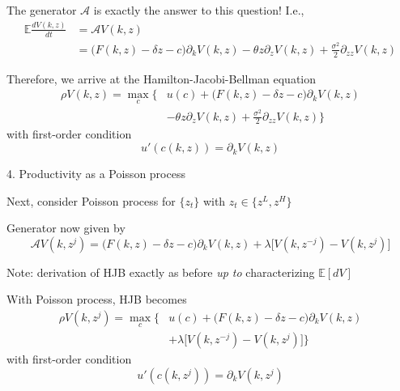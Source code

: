 \documentclass[11pt, aspectratio=169]{beamer}
\newenvironment{witemize}{\itemize\addtolength{\itemsep}{10pt}}{\enditemize}
\begin{document}
\begin{frame}{}
\begin{witemize}
\item The generator $\mathcal A$ is exactly the answer to this question! I.e., 
\begin{align*}
	\mathbb E \frac{d V(k, z)}{d t} &= \mathcal A V(k , z) \\
	&= \Big( F(k, z) - \delta z - c \Big) \partial_k V(k, z) - \theta z \partial_z V(k, z) + \frac{\sigma^2}{2} \partial_{zz} V(k, z)
\end{align*}

\item Therefore, we arrive at the Hamilton-Jacobi-Bellman equation
\begin{align*}
	\rho V(k, z) = \max_c \Big\{ & u(c) + \Big( F(k, z) - \delta z - c \Big) \partial_k V(k, z) \\
	&- \theta z \partial_z V(k, z) + \frac{\sigma^2}{2} \partial_{zz} V(k, z) \Big\}
\end{align*}
with first-order condition 
\begin{equation*}
	u'(c(k, z)) = \partial_k V(k, z)
\end{equation*}
\end{witemize}
\end{frame}



\begin{frame}{4. Productivity as a Poisson process}

{\small
\begin{witemize}
\item Next, consider Poisson process for $\{ z_t \}$ with $z_t \in \{z^L, z^H\}$

\item Generator now given by
\begin{equation*}
	\mathcal A V(k, z^j) = \Big( F(k, z) - \delta z - c \Big) \partial_k V(k, z) + \lambda \Big[ V(k, z^{-j}) - V(k, z^j) \Big]
\end{equation*}

\item Note: derivation of HJB exactly as before \textit{up to} characterizing $\mathbb E [d V]$

\item With Poisson process, HJB becomes
\begin{align*}
	\rho V(k, z^j) = \max_c \Big\{ & u(c) + \Big( F(k, z) - \delta z - c \Big) \partial_k V(k, z) \\
	&+ \lambda \Big[ V(k, z^{-j}) - V(k, z^j) \Big] \Big\}
\end{align*}
with first-order condition 
\begin{equation*}
	u'(c(k, z^j)) = \partial_k V(k, z^j)
\end{equation*}
\end{witemize}
}
\end{frame}
\end{document}
